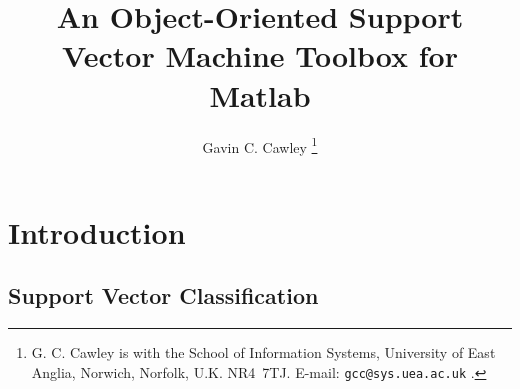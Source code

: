 \documentclass[twoside]{article}
\begin{document}
\title{\textbf{An Object-Oriented Support Vector Machine Toolbox for Matlab}}

\author
{
   Gavin C. Cawley
   \thanks{
   G. C. Cawley is with the School of Information Systems, University of East
   Anglia, Norwich, Norfolk, U.K. \mbox{NR4 7TJ}.  E-mail:
   \texttt{gcc@sys.uea.ac.uk} .}
}

\maketitle     

\begin{abstract}

\end{abstract}

\section{Introduction}

\subsection{Support Vector Classification}
\label{sec:svm}
\end{document}
